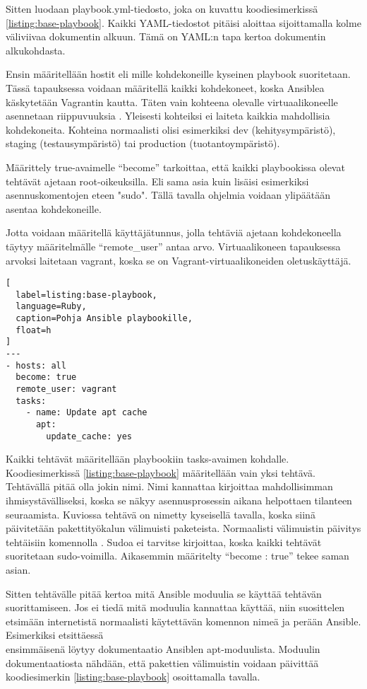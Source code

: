 Sitten luodaan playbook.yml-tiedosto, joka on kuvattu koodiesimerkissä \ref{listing:base-playbook}. Kaikki YAML-tiedostot pitäisi aloittaa sijoittamalla kolme väliviivaa dokumentin alkuun. Tämä on YAML:n tapa kertoa dokumentin alkukohdasta.

Ensin määritellään hostit eli mille kohdekoneille kyseinen playbook suoritetaan. Tässä tapauksessa voidaan määritellä kaikki kohdekoneet, koska Ansiblea käskytetään Vagrantin kautta. Täten vain kohteena olevalle virtuaalikoneelle asennetaan riippuvuuksia \cite{link:comprehensive-ansible-tutorial}. Yleisesti kohteiksi ei laiteta kaikkia mahdollisia kohdekoneita. Kohteina normaalisti olisi esimerkiksi dev (kehitysympäristö), staging (testausympäristö) tai production (tuotantoympäristö).

Määrittely true-avaimelle \enquote{become} tarkoittaa, että kaikki playbookissa olevat tehtävät ajetaan root-oikeuksilla. Eli sama asia kuin lisäisi esimerkiksi asennuskomentojen eteen "sudo". Tällä tavalla ohjelmia voidaan ylipäätään asentaa kohdekoneille. \cite{link:ansible-configuration-file}

Jotta voidaan määritellä käyttäjätunnus, jolla tehtäviä ajetaan kohdekoneella täytyy määritelmälle \enquote{remote\_user} antaa arvo. Virtuaalikoneen tapauksessa arvoksi laitetaan vagrant, koska se on Vagrant-virtuaalikoneiden oletuskäyttäjä.

\begin{lstlisting}[
  label=listing:base-playbook,
  language=Ruby,
  caption=Pohja Ansible playbookille,
  float=h
]
---
- hosts: all
  become: true
  remote_user: vagrant
  tasks:
    - name: Update apt cache
      apt:
        update_cache: yes
\end{lstlisting}

Kaikki tehtävät määritellään playbookiin tasks-avaimen kohdalle. Koodiesimerkissä \ref{listing:base-playbook} määritellään vain yksi tehtävä. Tehtävällä pitää olla jokin nimi. Nimi kannattaa kirjoittaa mahdollisimman ihmisystävälliseksi, koska se näkyy asennusprosessin aikana helpottaen tilanteen seuraamista. Kuviossa tehtävä on nimetty kyseisellä tavalla, koska siinä päivitetään pakettityökalun välimuisti paketeista. Normaalisti välimuistin päivitys tehtäisiin komennolla . Sudoa ei tarvitse kirjoittaa, koska kaikki tehtävät suoritetaan sudo-voimilla. Aikasemmin määritelty \enquote{become : true} tekee saman asian.

Sitten tehtävälle pitää kertoa mitä Ansible moduulia se käyttää tehtävän suorittamiseen. Jos ei tiedä mitä moduulia kannattaa käyttää, niin suosittelen etsimään internetistä normaalisti käytettävän komennon nimeä ja perään Ansible. Esimerkiksi etsittäessä \\  ensimmäisenä löytyy dokumentaatio Ansiblen apt-moduulista. Moduulin dokumentaatiosta nähdään, että pakettien välimuistin voidaan päivittää koodiesimerkin \ref{listing:base-playbook} osoittamalla tavalla.

